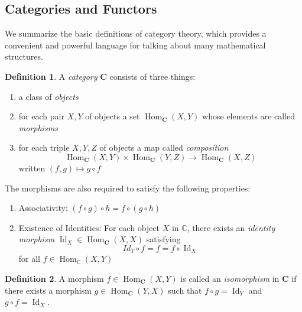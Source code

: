 \documentclass{article}
\DeclareMathOperator{\Id}{Id}
\DeclareMathOperator{\Hom}{Hom}
\theoremstyle{remark}
\theoremstyle{definition}
\newtheorem{definition}{Definition}[section]
\begin{document}
  \subsection{Categories and Functors}

    We summarize the basic definitions of category theory, which provides a convenient and powerful language for talking about many mathematical structures. 

    \begin{definition}
    A \textit{category} $\mathbf{C}$ consists of three things: 
    \begin{enumerate}
        \item a class of \textit{objects}
        \item for each pair $X, Y$ of objects a set $\Hom_\mathbf{C} (X, Y)$ whose elements are called \textit{morphisms}
        \item for each triple $X, Y, Z$ of objects a map called \textit{composition}
        \[\Hom_\mathbf{C} (X, Y) \times \Hom_\mathbf{C} (Y, Z) \longrightarrow \Hom_\mathbf{C} (X, Z)\]
        written $(f, g) \mapsto g \circ f$
    \end{enumerate}
    The morphisms are also required to satisfy the following properties: 
    \begin{enumerate}
        \item Associativity: $(f \circ g) \circ h = f \circ (g \circ h)$
        \item Existence of Identities: For each object $X$ in $\mathbb{C}$, there exists an \textit{identity morphism} $\Id_X \in \Hom_{\mathbf{C}}(X, X)$ satisfying 
        \[Id_Y \circ f = f = f \circ \Id_X\]
        for all $f \in \Hom_\mathbb{C} (X, Y)$
    \end{enumerate}
    \end{definition}

    \begin{definition}
    A morphism $f \in \Hom_\mathbf{C}(X, Y)$ is called an \textit{isomorphism} in $\mathbf{C}$ if there exists a morphism $g \in \Hom_\mathbf{C} (Y, X)$ such that $f \circ g = \Id_Y$ and $g \circ f = \Id_X$. 
    \end{definition}
\end{document}
